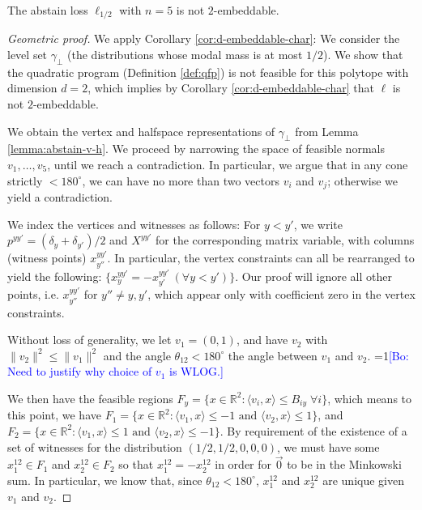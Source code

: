 \documentclass[anon]{colt2020} %
\newcommand{\Comments}{1}
\newcommand{\mynote}[2]{\ifnum\Comments=1\textcolor{#1}{#2}\fi}
\newcommand{\bo}[1]{\mynote{blue}{[Bo: #1]}}
\newcommand{\reals}{\mathbb{R}}
\newcommand{\inprod}[2]{\langle #1, #2 \rangle}%
\begin{document}
\begin{proposition}
	The abstain loss $\ell_{1/2}$ with $n=5$ is not $2$-embeddable.
\end{proposition}
\begin{proof}[Geometric proof]
  We apply Corollary \ref{cor:d-embeddable-char}: We consider the level set $\gamma_{\bot}$ (the distributions whose modal mass is at most $1/2$).
  We show that the quadratic program (Definition \ref{def:qfp}) is not feasible for this polytope with dimension $d=2$, which implies by Corollary \ref{cor:d-embeddable-char} that $\ell$ is not $2$-embeddable.

  We obtain the vertex and halfspace representations of $\gamma_{\bot}$ from Lemma \ref{lemma:abstain-v-h}.
  We proceed by narrowing the space of feasible normals $v_1, \ldots, v_5$, until we reach a contradiction.
  In particular, we argue that in any cone strictly $ < 180^\circ$, we can have no more than two vectors $v_i$ and $v_j$; otherwise we yield a contradiction.

  We index the vertices and witnesses as follows: For $y < y'$, we write $p^{yy'} = (\delta_y + \delta_{y'})/2$ and $X^{yy'}$ for the corresponding matrix variable, with columns (witness points) $x^{yy'}_{y''}$.
  In particular, the vertex constraints can all be rearranged to yield the following: $\{x^{yy'}_y = -x^{yy'}_{y'} ~ (\forall y < y')\}$.
  Our proof will ignore all other points, i.e. $x^{yy'}_{y''}$ for $y'' \neq y,y'$, which appear only with coefficient zero in the vertex constraints.
  
  Without loss of generality, we let $v_1 = (0,1)$, and have $v_2$ with $\|v_2\|^2 \leq \|v_1\|^2$ and the angle $\theta_{12} < 180^\circ$ the angle between $v_1$ and $v_2$. \bo{Need to justify why choice of $v_1$ is WLOG.}
  
  We then have the feasible regions $F_y = \{x \in \reals^2 : \inprod{v_i} {x} \leq B_{iy} \; \forall i\}$, which means to this point, we have $F_1 = \{x \in \reals^2 : \inprod{v_1}{x} \leq -1 \text{ and } \inprod{v_2}{x} \leq 1 \}$, and $F_2 = \{x \in \reals^2 : \inprod{v_1}{x} \leq 1 \text{ and } \inprod{v_2}{x} \leq -1 \}$.
  By requirement of the existence of a set of witnesses for the distribution $(1/2, 1/2, 0,0,0)$, we must have some $x^{12}_1 \in F_1$ and $x^{12}_2 \in F_2$ so that $x^{12}_1 = -x^{12}_2$ in order for $\vec 0$ to be in the Minkowski sum.
  In particular, we know that, since $\theta_{12} < 180^\circ$, $x^{12}_1$ and $x^{12}_2$ are unique given $v_1$ and $v_2$.
  

\end{proof}
\end{document}
